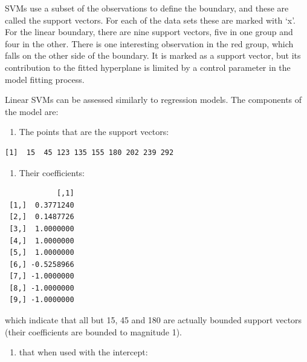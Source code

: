 \documentclass[
  letterpaper,
]{krantz}
\newenvironment{Shaded}{\begin{snugshade}}{\end{snugshade}}
\newcommand{\NormalTok}[1]{\textcolor[rgb]{0.00,0.23,0.31}{#1}}
\newcommand{\SpecialCharTok}[1]{\textcolor[rgb]{0.37,0.37,0.37}{#1}}
\providecommand{\tightlist}{%
  \setlength{\itemsep}{0pt}\setlength{\parskip}{0pt}}\usepackage{longtable,booktabs,array}
\begin{document}
SVMs use a subset of the observations to define the boundary, and these
are called the support vectors. For each of the data sets these are
marked with `x'. For the linear boundary, there are nine support
vectors, five in one group and four in the other. There is one
interesting observation in the red group, which falls on the other side
of the boundary. It is marked as a support vector, but its contribution
to the fitted hyperplane is limited by a control parameter in the model
fitting process.

Linear SVMs can be assessed similarly to regression models. The
components of the model are:

\begin{enumerate}
\def\labelenumi{\arabic{enumi}.}
\tightlist
\item
  The points that are the support vectors:
\end{enumerate}

\begin{Shaded}
\end{Shaded}

\begin{verbatim}
[1]  15  45 123 135 155 180 202 239 292
\end{verbatim}

\begin{enumerate}
\def\labelenumi{\arabic{enumi}.}
\setcounter{enumi}{1}
\tightlist
\item
  Their coefficients:
\end{enumerate}

\begin{Shaded}
\end{Shaded}

\begin{verbatim}
            [,1]
 [1,]  0.3771240
 [2,]  0.1487726
 [3,]  1.0000000
 [4,]  1.0000000
 [5,]  1.0000000
 [6,] -0.5258966
 [7,] -1.0000000
 [8,] -1.0000000
 [9,] -1.0000000
\end{verbatim}

which indicate that all but 15, 45 and 180 are actually bounded support
vectors (their coefficients are bounded to magnitude 1).

\begin{enumerate}
\def\labelenumi{\arabic{enumi}.}
\setcounter{enumi}{2}
\tightlist
\item
  that when used with the intercept:
\end{enumerate}
\end{document}

